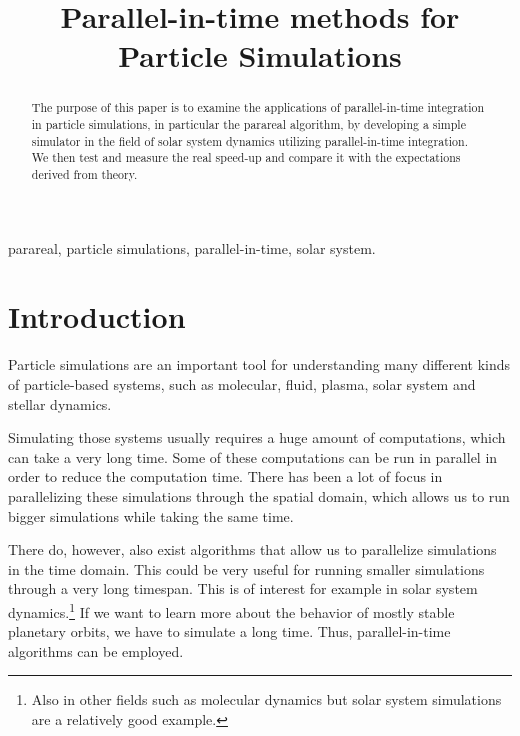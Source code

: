 \documentclass[conference]{IEEEtran}
\begin{document}
\title{Parallel-in-time methods for Particle Simulations}

\author{
}

\maketitle

\begin{abstract}
The purpose of this paper is to examine the applications of parallel-in-time integration in particle simulations, in particular the parareal algorithm, by developing a simple simulator in the field of solar system dynamics utilizing parallel-in-time integration. We then test and measure the real speed-up and compare it with the expectations derived from theory.
\end{abstract}

\begin{IEEEkeywords}
parareal, particle simulations, parallel-in-time, solar system.
\end{IEEEkeywords}

\section{Introduction}

Particle simulations are an important tool for understanding many different kinds of particle-based systems, such as molecular, fluid, plasma, solar system and stellar dynamics.

Simulating those systems usually requires a huge amount of computations, which can take a very long time. Some of these computations can be run in parallel in order to reduce the computation time. There has been a lot of focus in parallelizing these simulations through the spatial domain, which allows us to run bigger simulations while taking the same time.

There do, however, also exist algorithms that allow us to parallelize simulations in the time domain. This could be very useful for running smaller simulations through a very long timespan. This is of interest for example in solar system dynamics.\footnote{Also in other fields such as molecular dynamics \cite{moldyn} but solar system simulations are a relatively good example.} If we want to learn more about the behavior of mostly stable planetary orbits, we have to simulate a long time. Thus, parallel-in-time algorithms can be employed. \cite{parallelsolar}
\end{document}
